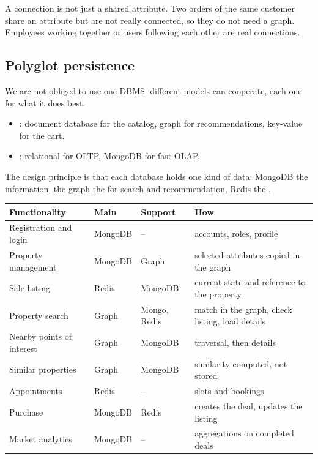 \begin{remark}
A connection is not just a shared attribute. Two orders of the same customer share an attribute but are not really connected, so they do not need a graph. Employees working together or users following each other are real connections.
\end{remark}

\subsection{Polyglot persistence}
We are not obliged to use one DBMS: different models can cooperate, each one for what it does best.
\begin{itemize}
  \item {}: document database for the catalog, graph for recommendations, key-value for the cart.
  \item {}: relational for OLTP, MongoDB for fast OLAP.
\end{itemize}

\begin{example}
The design principle is that each database holds one kind of data: MongoDB the  information, the graph the  for search and recommendation, Redis the .
\begin{center}\footnotesize
\begin{tabular}{p{4.4cm}p{1.5cm}p{1.9cm}p{4.6cm}}
\toprule
\textbf{Functionality} & \textbf{Main} & \textbf{Support} & \textbf{How} \\
\midrule
Registration and login & MongoDB & -- & accounts, roles, profile \\
Property management & MongoDB & Graph & selected attributes copied in the graph \\
Sale listing & Redis & MongoDB & current state and reference to the property \\
Property search & Graph & Mongo, Redis & match in the graph, check listing, load details \\
Nearby points of interest & Graph & MongoDB & traversal, then details \\
Similar properties & Graph & MongoDB & similarity computed, not stored \\
Appointments & Redis & -- & slots and bookings \\
Purchase & MongoDB & Redis & creates the deal, updates the listing \\
Market analytics & MongoDB & -- & aggregations on completed deals \\
\bottomrule
\end{tabular}
\end{center}
\end{example}

